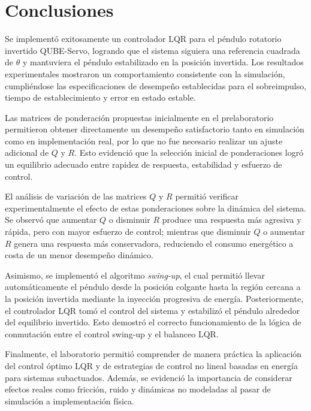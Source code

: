 \section{Conclusiones}

\noindent Se implementó exitosamente un controlador LQR para el péndulo rotatorio invertido QUBE-Servo, logrando que el sistema siguiera una referencia cuadrada de $\theta$ y mantuviera el péndulo estabilizado en la posición invertida. Los resultados experimentales mostraron un comportamiento consistente con la simulación, cumpliéndose las especificaciones de desempeño establecidas para el sobreimpulso, tiempo de establecimiento y error en estado estable.

\noindent Las matrices de ponderación propuestas inicialmente en el prelaboratorio permitieron obtener directamente un desempeño satisfactorio tanto en simulación como en implementación real, por lo que no fue necesario realizar un ajuste adicional de $Q$ y $R$. Esto evidenció que la selección inicial de ponderaciones logró un equilibrio adecuado entre rapidez de respuesta, estabilidad y esfuerzo de control.

\noindent El análisis de variación de las matrices $Q$ y $R$ permitió verificar experimentalmente el efecto de estas ponderaciones sobre la dinámica del sistema. Se observó que aumentar $Q$ o disminuir $R$ produce una respuesta más agresiva y rápida, pero con mayor esfuerzo de control; mientras que disminuir $Q$ o aumentar $R$ genera una respuesta más conservadora, reduciendo el consumo energético a costa de un menor desempeño dinámico.

\noindent Asimismo, se implementó el algoritmo \textit{swing-up}, el cual permitió llevar automáticamente el péndulo desde la posición colgante hasta la región cercana a la posición invertida mediante la inyección progresiva de energía. Posteriormente, el controlador LQR tomó el control del sistema y estabilizó el péndulo alrededor del equilibrio invertido. Esto demostró el correcto funcionamiento de la lógica de conmutación entre el control swing-up y el balanceo LQR.

\noindent Finalmente, el laboratorio permitió comprender de manera práctica la aplicación del control óptimo LQR y de estrategias de control no lineal basadas en energía para sistemas subactuados. Además, se evidenció la importancia de considerar efectos reales como fricción, ruido y dinámicas no modeladas al pasar de simulación a implementación física.